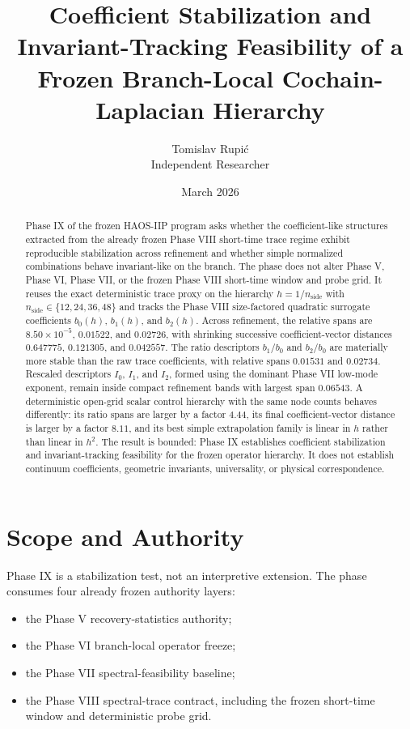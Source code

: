 \documentclass[11pt]{article}
\title{Coefficient Stabilization and Invariant-Tracking Feasibility of a Frozen Branch-Local Cochain-Laplacian Hierarchy}
\author{Tomislav Rupi\'c \\ Independent Researcher}
\date{March 2026}
\begin{document}
\maketitle

\begin{abstract}
Phase IX of the frozen HAOS-IIP program asks whether the coefficient-like structures extracted from the already frozen Phase VIII short-time trace regime exhibit reproducible stabilization across refinement and whether simple normalized combinations behave invariant-like on the branch. The phase does not alter Phase V, Phase VI, Phase VII, or the frozen Phase VIII short-time window and probe grid. It reuses the exact deterministic trace proxy on the hierarchy $h = 1 / n_{\mathrm{side}}$ with $n_{\mathrm{side}} \in \{12,24,36,48\}$ and tracks the Phase VIII size-factored quadratic surrogate coefficients $b_0(h)$, $b_1(h)$, and $b_2(h)$. Across refinement, the relative spans are $8.50 \times 10^{-5}$, $0.01522$, and $0.02726$, with shrinking successive coefficient-vector distances $0.647775$, $0.121305$, and $0.042557$. The ratio descriptors $b_1/b_0$ and $b_2/b_0$ are materially more stable than the raw trace coefficients, with relative spans $0.01531$ and $0.02734$. Rescaled descriptors $I_0$, $I_1$, and $I_2$, formed using the dominant Phase VII low-mode exponent, remain inside compact refinement bands with largest span $0.06543$. A deterministic open-grid scalar control hierarchy with the same node counts behaves differently: its ratio spans are larger by a factor $4.44$, its final coefficient-vector distance is larger by a factor $8.11$, and its best simple extrapolation family is linear in $h$ rather than linear in $h^2$. The result is bounded: Phase IX establishes coefficient stabilization and invariant-tracking feasibility for the frozen operator hierarchy. It does not establish continuum coefficients, geometric invariants, universality, or physical correspondence.
\end{abstract}

\section{Scope and Authority}

Phase IX is a stabilization test, not an interpretive extension. The phase consumes four already frozen authority layers:
\begin{itemize}
\item the Phase V recovery-statistics authority;
\item the Phase VI branch-local operator freeze;
\item the Phase VII spectral-feasibility baseline;
\item the Phase VIII spectral-trace contract, including the frozen short-time window and deterministic probe grid.
\end{itemize}
\end{document}
